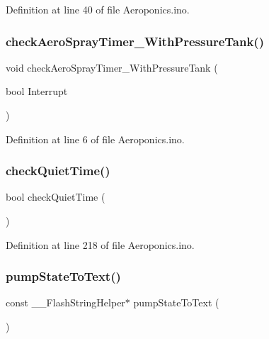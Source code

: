 Definition at line 40 of file Aeroponics.\+ino.

\mbox{\label{_aeroponics_8ino_a626742301e1adc19de38ee242058d7f0}} 
\subsubsection{\texorpdfstring{checkAeroSprayTimer\_WithPressureTank()}{checkAeroSprayTimer\_WithPressureTank()}}
{\footnotesize\ttfamily void check\+Aero\+Spray\+Timer\+\_\+\+With\+Pressure\+Tank (\begin{DoxyParamCaption}\item[{bool}]{Interrupt }\end{DoxyParamCaption})}



Definition at line 6 of file Aeroponics.\+ino.

\mbox{\label{_aeroponics_8ino_a8ce2c963794ec52c6a3eb9e861f0a6d0}} 
\subsubsection{\texorpdfstring{checkQuietTime()}{checkQuietTime()}}
{\footnotesize\ttfamily bool check\+Quiet\+Time (\begin{DoxyParamCaption}{ }\end{DoxyParamCaption})}



Definition at line 218 of file Aeroponics.\+ino.

\mbox{\label{_aeroponics_8ino_a9bce754224237f28c8829aa5ca525dbf}} 
\subsubsection{\texorpdfstring{pumpStateToText()}{pumpStateToText()}}
{\footnotesize\ttfamily const \+\_\+\+\_\+\+Flash\+String\+Helper$\ast$ pump\+State\+To\+Text (\begin{DoxyParamCaption}{ }\end{DoxyParamCaption})}



